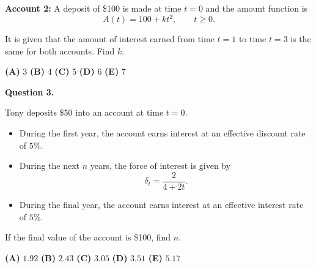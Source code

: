 \documentclass[11pt]{article}
\begin{document}
\textbf{Account 2:} A deposit of \$100 is made at time $t=0$ and the amount function is
\[
A(t)=100+kt^{2}, \qquad t\ge 0.
\]

\medskip

It is given that the amount of interest earned from time $t=1$ to time $t=3$ is the same for both accounts. Find $k$.

\medskip

\begin{center}

\textbf{(A)} $3$
\hspace{1cm}
\textbf{(B)} $4$
\hspace{1cm}
\textbf{(C)} $5$
\hspace{1cm}
\textbf{(D)} $6$
\hspace{1cm}
\textbf{(E)} $7$

\end{center}

\newpage


\textbf{Question 3.}

Tony deposits \$50 into an account at time $t=0$.

\begin{itemize}
    \item During the first year, the account earns interest at an effective discount rate of $5\%$.
    \item During the next $n$ years, the force of interest is given by
    \[
    \delta_t=\frac{2}{4+2t}.
    \]
    \item During the final year, the account earns interest at an effective interest rate of $5\%$.
\end{itemize}

If the final value of the account is \$100, find $n$.

\medskip

\begin{center}

\textbf{(A)} $1.92$
\hspace{1cm}
\textbf{(B)} $2.43$
\hspace{1cm}
\textbf{(C)} $3.05$
\hspace{1cm}
\textbf{(D)} $3.51$
\hspace{1cm}
\textbf{(E)} $5.17$

\end{center}
\end{document}
